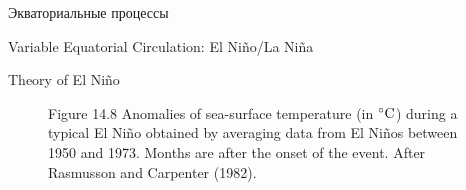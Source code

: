 \begin{chapter}{Экваториальные процессы}
\begin{section}{Variable Equatorial Circulation: El Ni\~{n}o/La Ni\~{n}a}
\begin{paragraph}{Theory of El Ni\~{n}o}
\begin{figure}[p!]
\caption{Figure 14.8 Anomalies
of sea-surface temperature (in ${}^\circ\mbox{C}$) during a
typical El Ni\~{n}o obtained by averaging data from El Ni\~{n}os
between 1950 and 1973. Months are after the onset of the event. After
Rasmusson and Carpenter (1982).}
\label{fig:elninoanomalies}
\end{figure}
%


\end{paragraph}
\end{section}
\end{chapter}
